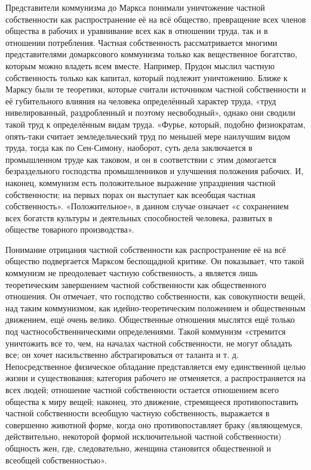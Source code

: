 \documentclass[../main]{subfiles}
\begin{document}
Представители коммунизма до Маркса понимали уничтожение частной собственности как распространение её на всё общество, превращение всех членов общества в рабочих и уравнивание всех как в отношении труда, так и в отношении потребления. Частная собственность рассматривается многими представителями домарксового коммунизма только как вещественное богатство, которым можно владеть всем вместе. Например, Прудон мыслил частную собственность только как капитал, который подлежит уничтожению. Ближе к Марксу были те теоретики, которые считали источником частной собственности и её губительного влияния на человека определённый характер труда, «труд нивелированный, раздробленный и поэтому несвободный», однако они сводили такой труд к определённым видам труда. «Фурье, который, подобно физиократам, опять-таки считает земледельческий труд по меньшей мере наилучшим видом труда, тогда как по Сен-Симону, наоборот, суть дела заключается в промышленном труде как таковом, и он в соответствии с этим домогается безраздельного господства промышленников и улучшения положения рабочих. И, наконец, коммунизм есть положительное выражение упразднения частной собственности; на первых порах он выступает как всеобщая частная собственность». «Положительное», в данном случае означает «с сохранением всех богатств культуры и деятельных способностей человека, развитых в обществе товарного производства».

Понимание отрицания частной собственности как распространение её на всё общество подвергается Марксом беспощадной критике. Он показывает, что такой коммунизм не преодолевает частную собственность, а является лишь теоретическим завершением частной собственности как общественного отношения. Он отмечает, что господство собственности, как совокупности вещей, над таким коммунизмом, как идейно-теоретическим положением и общественным движением, ещё очень велико. Общественные отношения мыслятся ещё только под частнособственническими определениями. Такой коммунизм «стремится уничтожить все то, чем, на началах частной собственности, не могут обладать все; он хочет насильственно абстрагироваться от таланта и т. д. Непосредственное физическое обладание представляется ему единственной целью жизни и существования; категория рабочего не отменяется, а распространяется на всех людей; отношение частной собственности остается отношением всего общества к миру вещей; наконец, это движение, стремящееся противопоставить частной собственности всеобщую частную собственность, выражается в совершенно животной форме, когда оно противопоставляет браку (являющемуся, действительно, некоторой формой исключительной частной собственности) общность жен, где, следовательно, женщина становится общественной и всеобщей собственностью».
\end{document}
